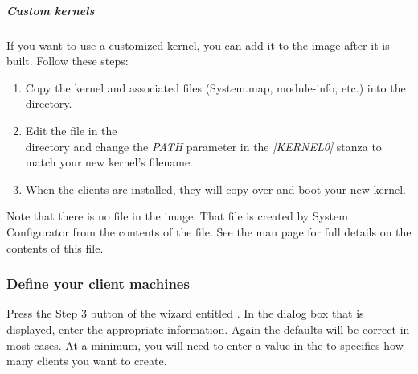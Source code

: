 \subparagraph{Custom kernels}
If you want to use a customized kernel, you can add it to the image
after it is built. Follow these steps:
\begin{enumerate}
\item Copy the kernel and associated files (System.map, module-info, etc.) into the \\
 directory.
\item Edit the  file in the \\
directory and change the \emph{PATH} parameter in the \emph{[KERNEL0]} stanza to 
match your new kernel's filename.
\item When the clients are installed, they will copy over and boot your new
kernel. 
\end{enumerate}
Note that there is no  file in the image. That file is created
by System Configurator from the contents of the  file. See the  man page for full details on the
contents of this file.

\subsubsection{Define your client machines} 
\label{det:defclients}

Press the Step 3 button of the wizard entitled . In the dialog box that is displayed, enter the
appropriate information. Again the defaults will be correct in most
cases. At a minimum, you will need to enter a value in the 
to specifies how many clients you want to create.

